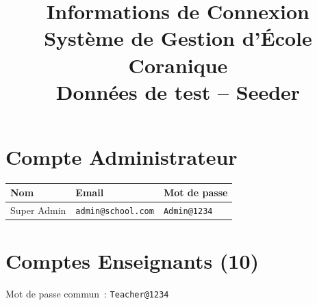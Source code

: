 \documentclass[a4paper,11pt]{article}
\title{%
    \vspace{-1cm}
    {\LARGE \textcolor{headerblue}{\textbf{Informations de Connexion}}} \\[0.3cm]
    {\large Système de Gestion d'École Coranique} \\[0.2cm]
    {\normalsize Données de test -- Seeder}
}
\author{}
\date{}
\begin{document}
\maketitle
\thispagestyle{fancy}

\section*{\textcolor{admincolor}{Compte Administrateur}}

\begin{tabularx}{\textwidth}{l X l}
    \toprule
    \textbf{Nom}   & \textbf{Email}        & \textbf{Mot de passe} \\
    \midrule
    Super Admin     & \texttt{admin@school.com}  & \texttt{Admin@1234} \\
    \bottomrule
\end{tabularx}

\vspace{0.5cm}

\section*{\textcolor{teachercolor}{Comptes Enseignants (10)}}

\noindent Mot de passe commun~: \texttt{Teacher@1234}

\vspace{0.3cm}
\end{document}
